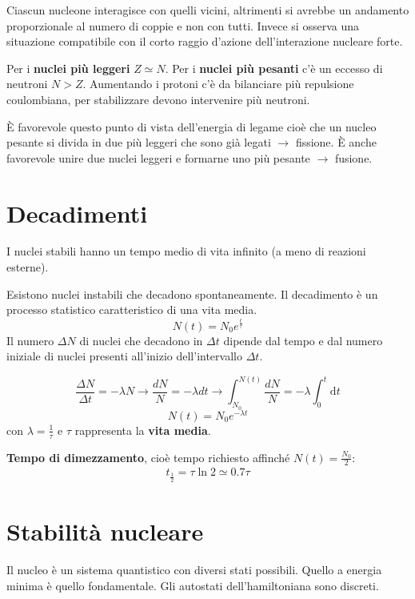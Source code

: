 \documentclass[a4paper,11pt,twoside,openany]{book}
\theoremstyle{definition}
\theoremstyle{plain}
\theoremstyle{plain}
\theoremstyle{definition}
\begin{document}
Ciascun nucleone interagisce con quelli vicini, altrimenti si avrebbe un andamento proporzionale al numero di coppie e non con tutti. Invece si osserva una situazione compatibile con il corto raggio d'azione dell'interazione nucleare forte.

Per i \textbf{nuclei più leggeri} $Z \simeq N$. Per i \textbf{nuclei più pesanti} c'è un eccesso di neutroni $N>Z$. Aumentando i protoni c'è da bilanciare più repulsione coulombiana, per stabilizzare devono intervenire più neutroni.

È favorevole questo punto di vista dell'energia di legame cioè che un nucleo pesante si divida in due più leggeri che sono già legati $\rightarrow$ fissione. È anche favorevole unire due nuclei leggeri e formarne uno più pesante $\rightarrow$ fusione.

\section{Decadimenti} %
I nuclei stabili hanno un tempo medio di vita infinito (a meno di reazioni esterne).

Esistono nuclei instabili che decadono spontaneamente. Il decadimento è un processo statistico caratteristico di una vita media.
\begin{equation}
N(t)=N_0e^{\frac{t}{\tau}}
\end{equation}
Il numero $\Delta N$ di nuclei che decadono in $\Delta t$ dipende dal tempo e dal numero iniziale di nuclei presenti all'inizio dell'intervallo $\Delta t$.

\begin{equation}
\frac{\Delta N}{\Delta t}=-\lambda N \longrightarrow \frac{dN}{N}=-\lambda dt \longrightarrow \int_{N_0}^{N(t)}{\frac{dN}{N}}=-\lambda\int_{0}^{t}{\textrm{d}t}
\end{equation}
\begin{equation}
N(t)=N_0e^{-\lambda t}
\end{equation}
con $\lambda=\frac{1}{\tau}$ e $\tau$ rappresenta la \textbf{vita media}.

\textbf{Tempo di dimezzamento}, cioè tempo richiesto affinché $N(t)=\frac{N_0}{2}$:
\begin{equation}\begin{split}
t_{\frac{1}{2}}=\tau\ln{2}\simeq 0.7 \tau
\end{split}\end{equation}

\section{Stabilità nucleare} %
Il nucleo è un sistema quantistico con diversi stati possibili. Quello a energia minima è quello fondamentale. Gli autostati dell'hamiltoniana sono discreti.
\end{document}
